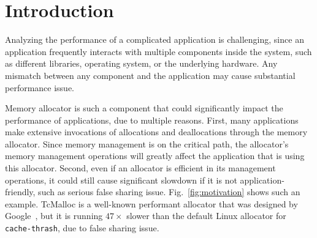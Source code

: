 

\section{Introduction}

Analyzing the performance of a complicated application is challenging, since an application frequently interacts with multiple components inside the system, such as different libraries, operating system, or the underlying hardware. Any mismatch between any component and the application may cause substantial performance issue.

Memory allocator is such a component that could significantly impact the performance of applications, due to multiple reasons. First, many applications make extensive invocations of allocations and deallocations through the memory allocator. Since memory management is on the critical path, the allocator's memory management operations will greatly affect the application that is using this allocator. 
Second, even if an allocator is efficient in its management operations, it could still cause significant slowdown if it is not application-friendly, such as serious false sharing issue. Fig.~\ref{fig:motivation} shows such an example. TcMalloc is a well-known performant allocator that was designed by Google~\cite{tcmalloc}, but it is running $47\times$ slower than the default Linux allocator for \texttt{cache-thrash}, due to false sharing issue. 



